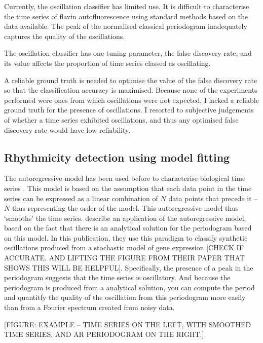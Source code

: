Currently, the oscillation classifier has limited use.
It is difficult to characterise the time series of flavin autofluorescence using standard methods based on the data available.
The peak of the normalised classical periodogram inadequately captures the quality of the oscillations.

The oscillation classifier has one tuning parameter, the false discovery rate, and its value affects the proportion of time series classed as oscillating.

A reliable ground truth is needed to optimise the value of the false discovery rate so that the classification accuracy is maximised.
Because none of the experiments performed were ones from which oscillations were not expected, I lacked a reliable ground truth for the presence of oscillations.
I resorted to subjective judgements of whether a time series exhibited oscillations, and thus any optimised false discovery rate would have low reliability.

\subsection{Rhythmicity detection using model fitting}
\label{subsec:analysis-classification-ar}

The autoregressive model has been used before to characterise biological time series \parencite{zielinskiStrengthsLimitationsPeriod2014}.
This model is based on the assumption that each data point in the time series can be expressed as a linear combination of $N$ data points that precede it -- $N$ thus representing the order of the model.
This autoregressive model thus `smooths' the time series.
\parencite{jiaFrequencyDomainAnalysis2021} describe an application of the autoregressive model, based on the fact that there is an analytical solution for the periodogram based on this model.
In this publication, they use this paradigm to classify synthetic oscillations produced from a stochastic model of gene expression [CHECK IF ACCURATE.  AND LIFTING THE FIGURE FROM THEIR PAPER THAT SHOWS THIS WILL BE HELPFUL].
Specifically, the presence of a peak in the periodogram suggests that the time series is oscillatory.
And because the periodogram is produced from a analytical solution, you can compute the period and quantitfy the quality of the oscillation from this periodogram more easily than from a Fourier spectrum created from noisy data.

[FIGURE: EXAMPLE -- TIME SERIES ON THE LEFT, WITH SMOOTHED TIME SERIES, AND AR PERIODOGRAM ON THE RIGHT.]

